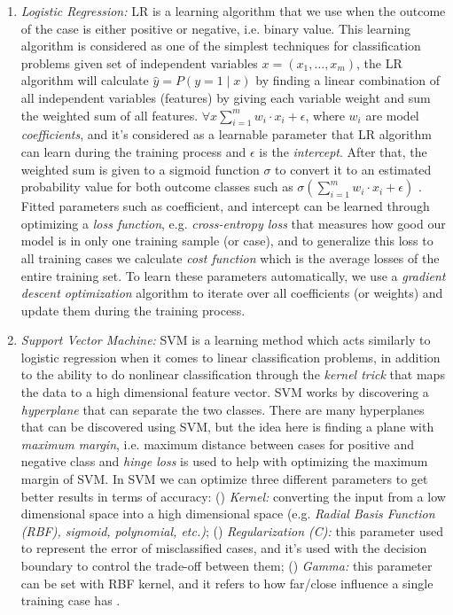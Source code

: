 \begin{enumerate}
	\item \textit{Logistic Regression:} LR is a  learning algorithm that we use when the outcome of the case is either positive or negative, i.e. binary value. This learning algorithm is considered as one of the simplest techniques for classification problems given set of independent variables $x= (x_1, \dots, x_m)$, the LR algorithm will calculate $\hat{y} = P(y=1 \mid x)$ by finding a linear combination of all independent variables (features) by giving each variable weight and sum the weighted sum of all features. $\forall x \sum_{i=1}^{m} w_i \cdot x_i + \epsilon $, where $w_i$ are model \textit{coefficients}, and it's considered as a learnable parameter that LR algorithm can learn during the training process and $\epsilon$ is the \textit{intercept}. After that, the weighted sum is given to a sigmoid function $\sigma$ to convert it to an estimated probability value for both outcome classes such as $\sigma (\sum_{i=1}^{m} w_i \cdot x_i + \epsilon)$ . Fitted parameters such as coefficient, and intercept can be learned through optimizing a \textit{loss function}, e.g. \textit{cross-entropy loss} that measures how good our model is in only one training sample (or case), and to generalize this loss to all training cases we calculate \textit{cost function} which is the average losses of the entire training set. To learn these parameters automatically, we use a \textit{gradient descent optimization} algorithm to iterate over all coefficients (or weights) and update them during the training process. 

	\item \textit{Support Vector Machine:} SVM is a learning method which acts similarly to logistic regression when it comes to linear classification problems, in addition to the ability to do nonlinear classification through the \textit{kernel trick} that maps the data to a high dimensional feature vector. SVM works by discovering a \textit{hyperplane} that can separate the two classes. There are many hyperplanes that can be discovered using SVM, but the idea here is finding a plane with \textit{maximum margin}, i.e. maximum distance between cases for positive and negative class and \textit{hinge loss} is used to help with optimizing the maximum margin of SVM. In SVM we can optimize three different parameters to get better results in terms of accuracy: () \textit{Kernel:} converting the input from a low dimensional space into a high dimensional space (e.g.  \textit{Radial Basis Function (RBF), sigmoid, polynomial, etc.)}; () \textit{Regularization (C):} this parameter used to represent the error of misclassified cases, and it’s used with the decision boundary to control the trade-off between them; () \textit{Gamma:} this parameter can be set with RBF kernel, and it refers to how far/close influence a single training case has \cite{platt1999probabilistic}.

\end{enumerate}

